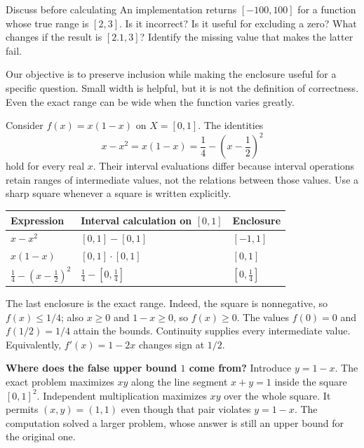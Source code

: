 \begin{question}{Discuss before calculating}
An implementation returns $[-100,100]$ for a function whose true range is
$[2,3]$. Is it incorrect? Is it useful for excluding a zero? What changes if
the result is $[2.1,3]$? Identify the missing value that makes the latter fail.
\end{question}

Our objective is to preserve inclusion while making the enclosure useful for
a specific question. Small width is helpful, but it is not the definition of
correctness. Even the exact range can be wide when the function varies greatly.

\newpage
{}

Consider $f(x)=x(1-x)$ on $X=[0,1]$. The identities
\[
       x-x^2=x(1-x)=\frac14-\left(x-\frac12\right)^2
\]
hold for every real $x$. Their interval evaluations differ because interval
operations retain ranges of intermediate values, not the relations between
those values. Use a sharp square whenever a square is written explicitly.

\begin{center}
\begin{tabular}{lll}
\toprule
Expression & Interval calculation on $[0,1]$ & Enclosure\\
\midrule
$x-x^2$ & $[0,1]-[0,1]$ & $[-1,1]$\\
$x(1-x)$ & $[0,1]\cdot[0,1]$ & $[0,1]$\\
$\frac14-(x-\frac12)^2$ & $\frac14-[0,\frac14]$ & $[0,\frac14]$\\
\bottomrule
\end{tabular}
\end{center}

The last enclosure is the exact range. Indeed, the square is nonnegative,
so $f(x)\leq 1/4$; also $x\geq0$ and $1-x\geq0$, so $f(x)\geq0$.
The values $f(0)=0$ and $f(1/2)=1/4$ attain the bounds. Continuity supplies
every intermediate value. Equivalently, $f'(x)=1-2x$ changes sign at $1/2$.

\textbf{Where does the false upper bound $1$ come from?}
Introduce $y=1-x$. The exact problem maximizes $xy$ along the line segment
$x+y=1$ inside the square $[0,1]^2$. Independent multiplication maximizes
$xy$ over the whole square. It permits $(x,y)=(1,1)$ even though that pair
violates $y=1-x$. The computation solved a larger problem, whose answer is
still an upper bound for the original one.

